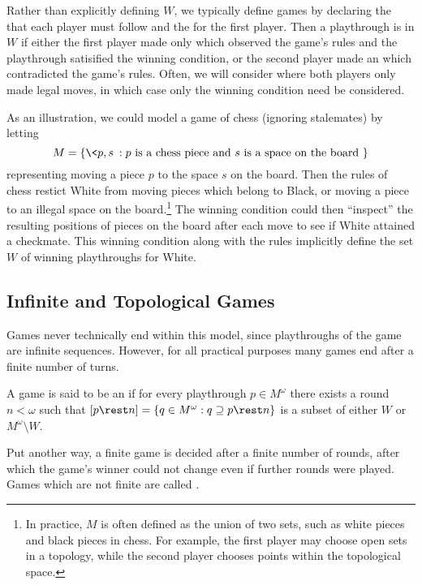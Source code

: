 Rather than explicitly defining $W$, we
typically define games by declaring the  that each player must
follow and the  for the first player.
Then a playthrough is in $W$ if either
the first player made only  which observed the game's rules
and the playthrough satisified the winning condition, or the second player
made an  which contradicted the game's rules.
Often, we will consider  where both players only
made legal moves, in which case only the winning condition need be considered.

As an illustration, we could model a game of chess (ignoring stalemates)
by letting
\[
  M = \{\<p,s\>: p \text{ is a chess piece and }
                 s \text{ is a space on the board } \}
\]
representing moving a piece $p$ to the space $s$ on the board. Then the
rules of chess restict White from moving pieces which belong to
Black, or moving a piece to an illegal space on the board.\footnote{
  In practice, $M$ is often defined as the union of two sets, such
  as white pieces and black pieces in chess. For example,
  the first player may choose open sets in a topology, while the second player
  chooses points within the topological space.
}
The winning condition could then
``inspect'' the resulting positions of pieces on the board after each move
to see if White attained a
checkmate. This winning condition along with the rules implicitly define the
set $W$ of winning playthroughs for White.


\subsection{Infinite and Topological Games}

Games never technically end within this model, since
playthroughs of the game are infinite sequences. However, for all practical
purposes many games end after a finite number of turns.

\begin{defn}
  A game is said to be an  if for every playthrough
  $p\in M^\omega$ there exists a round $n<\omega$ such that
    $
      [p\rest n] = \{q\in M^\omega : q\supseteq p\rest n \}
    $
  is a subset of either $W$ or $M^\omega\setminus W$.
\end{defn}

Put another way, a finite game is decided after a finite number
of rounds, after which the game's winner could not change even if further
rounds were played.
Games which are not finite are called .

